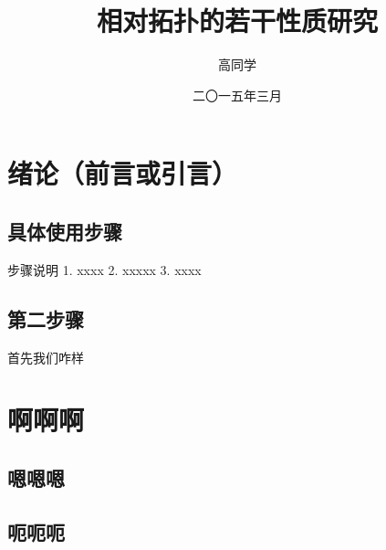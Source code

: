 \documentclass[forprint]{HNUthesis}
\begin{document}

\title{相对拓扑的若干性质研究}                 %
\author{高同学}                               %
\date{二〇一五年三月}                         %

\maketitle


\tableofcontents
\thispagestyle{empty}

\frontmatter  %

\mainmatter   %

\baselineskip=21pt  %

\chapter{绪论（前言或引言）}

\section{具体使用步骤}

步骤说明
1. xxxx
2. xxxxx
3. xxxx

\section{第二步骤}

首先我们咋样

\chapter{啊啊啊}

\section{嗯嗯嗯}

\section{呃呃呃}
\end{document}
